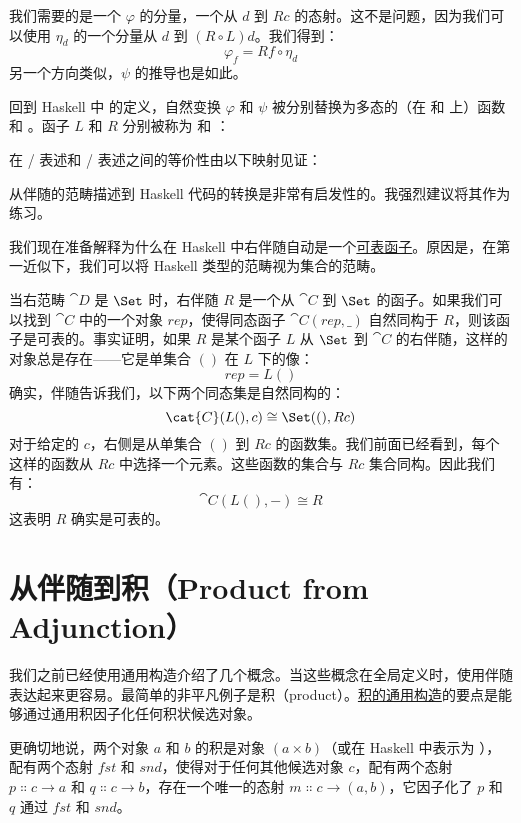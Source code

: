 我们需要的是一个 $\varphi$ 的分量，一个从 $d$ 到 $R c$ 的态射。这不是问题，因为我们可以使用 $\eta_d$ 的一个分量从 $d$ 到 $(R \circ L) d$。我们得到：
\[\varphi_f = R f \circ \eta_d\]
另一个方向类似，$\psi$ 的推导也是如此。

回到 Haskell 中  的定义，自然变换 $\varphi$ 和 $\psi$ 被分别替换为多态的（在  和  上）函数  和 。函子 $L$ 和 $R$ 分别被称为  和 ：

在 / 表述和 /\allowbreak{} 表述之间的等价性由以下映射见证：

从伴随的范畴描述到 Haskell 代码的转换是非常有启发性的。我强烈建议将其作为练习。

我们现在准备解释为什么在 Haskell 中右伴随自动是一个\hyperref[representable-functors]{可表函子}。原因是，在第一近似下，我们可以将 Haskell 类型的范畴视为集合的范畴。

当右范畴 $\cat{D}$ 是 $\Set$ 时，右伴随 $R$ 是一个从 $\cat{C}$ 到 $\Set$ 的函子。如果我们可以找到 $\cat{C}$ 中的一个对象 $\mathit{rep}$，使得同态函子 $\cat{C}(\mathit{rep}, \_)$ 自然同构于 $R$，则该函子是可表的。事实证明，如果 $R$ 是某个函子 $L$ 从 $\Set$ 到 $\cat{C}$ 的右伴随，这样的对象总是存在——它是单集合 $()$ 在 $L$ 下的像：
\[\mathit{rep} = L ()\]
确实，伴随告诉我们，以下两个同态集是自然同构的：
\[\cat{C}(L (), c) \cong \Set((), R c)\]
对于给定的 $c$，右侧是从单集合 $()$ 到 $R c$ 的函数集。我们前面已经看到，每个这样的函数从 $R c$ 中选择一个元素。这些函数的集合与 $R c$ 集合同构。因此我们有：
\[\cat{C}(L (), -) \cong R\]
这表明 $R$ 确实是可表的。

\section{从伴随到积（Product from Adjunction）}

我们之前已经使用通用构造介绍了几个概念。当这些概念在全局定义时，使用伴随表达起来更容易。最简单的非平凡例子是积（product）。\hyperref[products-and-coproducts]{积的通用构造}的要点是能够通过通用积因子化任何积状候选对象。

更确切地说，两个对象 $a$ 和 $b$ 的积是对象 $(a\times{}b)$（或在 Haskell 中表示为 ），配有两个态射 $\mathit{fst}$ 和 $\mathit{snd}$，使得对于任何其他候选对象 $c$，配有两个态射 $p \Colon c \to a$ 和 $q \Colon c \to b$，存在一个唯一的态射 $m \Colon c \to (a, b)$，它因子化了 $p$ 和 $q$ 通过 $\mathit{fst}$ 和 $\mathit{snd}$。

